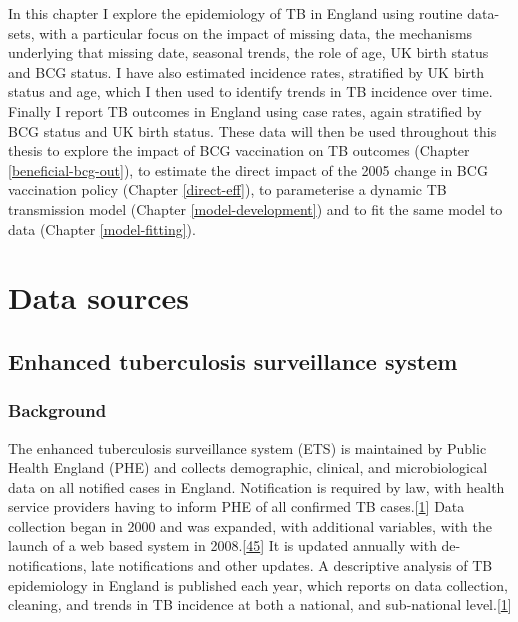 \documentclass[11pt,twoside]{bristolthesis}
\begin{document}
  In this chapter I explore the epidemiology of TB in England using routine data-sets, with a particular focus on the impact of missing data, the mechanisms underlying that missing date, seasonal trends, the role of age, UK birth status and BCG status. I have also estimated incidence rates, stratified by UK birth status and age, which I then used to identify trends in TB incidence over time. Finally I report TB outcomes in England using case rates, again stratified by BCG status and UK birth status. These data will then be used throughout this thesis to explore the impact of BCG vaccination on TB outcomes (Chapter \ref{beneficial-bcg-out}), to estimate the direct impact of the 2005 change in BCG vaccination policy (Chapter \ref{direct-eff}), to parameterise a dynamic TB transmission model (Chapter \ref{model-development}) and to fit the same model to data (Chapter \ref{model-fitting}).
  
  \hypertarget{data-sources}{%
  \section{Data sources}\label{data-sources}}
  
  \hypertarget{ets-deep-dive}{%
  \subsection{Enhanced tuberculosis surveillance system}\label{ets-deep-dive}}
  
  \hypertarget{background-1}{%
  \subsubsection{Background}\label{background-1}}
  
  The enhanced tuberculosis surveillance system (ETS) is maintained by Public Health England (PHE) and collects demographic, clinical, and microbiological data on all notified cases in England. Notification is required by law, with health service providers having to inform PHE of all confirmed TB cases.{[}\protect\hyperlink{ref-PHE2017}{1}{]} Data collection began in 2000 and was expanded, with additional variables, with the launch of a web based system in 2008.{[}\protect\hyperlink{ref-Kriujshaar2007}{45}{]} It is updated annually with de-notifications, late notifications and other updates. A descriptive analysis of TB epidemiology in England is published each year, which reports on data collection, cleaning, and trends in TB incidence at both a national, and sub-national level.{[}\protect\hyperlink{ref-PHE2017}{1}{]}
  
\end{document}
